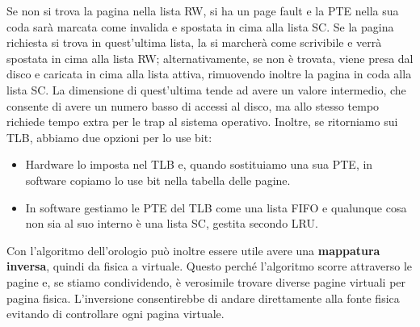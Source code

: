 \noindent Se non si trova la pagina nella lista RW, si ha un page fault e la PTE nella sua coda sarà marcata come invalida e spostata in cima alla lista
SC. Se la pagina richiesta si trova in quest'ultima lista, la si marcherà come scrivibile e verrà spostata in cima alla lista RW; alternativamente, se
non è trovata, viene presa dal disco e caricata in cima alla lista attiva, rimuovendo inoltre la pagina in coda alla lista SC. La dimensione di
quest'ultima tende ad avere un valore intermedio, che consente di avere un numero basso di accessi al disco, ma allo stesso tempo richiede tempo extra
per le trap al sistema operativo. Inoltre, se ritorniamo sui TLB, abbiamo due opzioni per lo use bit: \begin{itemize}
    \item Hardware lo imposta nel TLB e, quando sostituiamo una sua PTE, in software copiamo lo use bit nella tabella delle pagine.
    \item In software gestiamo le PTE del TLB come una lista FIFO e qualunque cosa non sia al suo interno è una lista SC, gestita secondo LRU.
\end{itemize}

\noindent Con l'algoritmo dell'orologio può inoltre essere utile avere una \textbf{mappatura inversa}, quindi da fisica a virtuale. Questo perché
l'algoritmo scorre attraverso le pagine e, se stiamo condividendo, è verosimile trovare diverse pagine virtuali per pagina fisica. L'inversione
consentirebbe di andare direttamente alla fonte fisica evitando di controllare ogni pagina virtuale.

%

